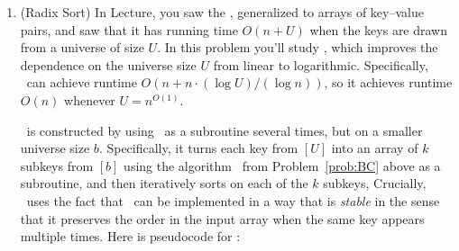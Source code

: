 \documentclass[11pt]{article}
\begin{document}
\begin{enumerate}
\begin{enumerate}
\item Describe the computational problem $\Pi$ in words.  (You may find it useful to try some more examples with $b=10$.) 

\item Is there any $x\in \Inputs$ for which $f(x)=\emptyset$? If so, give an example; if not, explain why.

\item For each possible input $x\in \Inputs$, what is $|f(x)|$? ($|A|$ is the size of a set $A$.) Justify your answer(s) in one or two sentences.

\item Let $\Pi'=(\Inputs,\Outputs,f')$ be the problem with the same $\Inputs$ and $\Outputs$ as $\Pi$, but $f'(n,b,k) = f(n,b,k) \cup \{(0,1, \ldots,k-1)\}$. Does every algorithm $A$ that solves $\Pi$ also solve $\Pi'$? (Hint: any differences between inputs that were relevant in the previous subproblem are worth considering here.) Justify your answer with a proof or a counterexample.

\end{enumerate}
\newpage

\item (Radix Sort) In Lecture, you saw the \SingletonBucketSort, generalized to arrays of key--value pairs, and saw that it has running time $O(n+U)$ when the keys are drawn from a universe of size $U$. In this problem you'll study {\em \RadixSort}, which improves the dependence on the universe size $U$ from linear to logarithmic.  Specifically, \RadixSort\ can achieve runtime $O(n+n\cdot (\log U)/(\log n))$, so it achieves runtime $O(n)$ whenever $U = n^{O(1)}$.  

\RadixSort\ is constructed by using \SingletonBucketSort\ as a subroutine several times, but on a smaller universe size $b$.  Specifically, it turns each key from $[U]$ into an array of $k$ subkeys from $[b]$ using the algorithm \BC\ from Problem~\ref{prob:BC} above as a subroutine, and then iteratively sorts on each of the $k$ subkeys,
Crucially, \RadixSort\ uses the fact that \SingletonBucketSort\ can be implemented in a way that is {\em stable} in the sense that it preserves the order in the input array when the same key appears multiple times.  Here is pseudocode for \RadixSort:



\end{enumerate}
\end{document}
